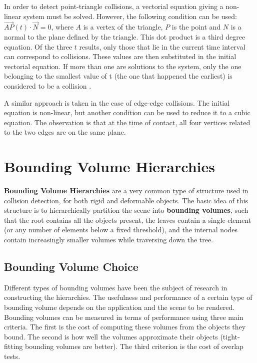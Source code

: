In order to detect point-triangle collisions, a vectorial equation giving a non-linear system must be solved. However, the following condition can be used: $\overrightarrow{AP}(t) \cdot \overrightarrow{N} = 0$, where $A$ is a vertex of the triangle, $P$ is the point and $N$ is a normal to the plane defined by the triangle. This dot product is a third degree equation. Of the three $t$ results, only those that lie in the current time interval can correspond to collisions. These values are then substituted in the initial vectorial equation. If more than one are solutions to the system, only the one belonging to the smallest value of t (the one that happened the earliest) is considered to be a collision \citep{provot97}.

A similar approach is taken in the case of edge-edge collisions. The initial equation is non-linear, but another condition can be used to reduce it to a cubic equation. The observation is that at the time of contact, all four vertices related to the two edges are on the same plane.


\section{Bounding Volume Hierarchies}
\label{sec:bvh}

\textbf{Bounding Volume Hierarchies} are a very common type of structure used in collision detection, for both rigid and deformable objects. The basic idea of this structure is to hierarchically partition the scene into \textbf{bounding volumes}, such that the root contains all the objects present, the leaves contain a single element (or any number of elements below a fixed threshold), and the internal nodes contain increasingly smaller volumes while traversing down the tree.

\subsection{Bounding Volume Choice}
\label{sub-sec:bvc}

Different types of bounding volumes have been the subject of research in constructing the hierarchies. The usefulness and performance of a certain type of bounding volume depends on the application and the scene to be rendered. Bounding volumes can be measured in terms of performance using three main criteria. The first is the cost of computing these volumes from the objects they bound. The second is how well the volumes approximate their objects (tight-fitting bounding volumes are better). The third criterion is the cost of overlap tests.

